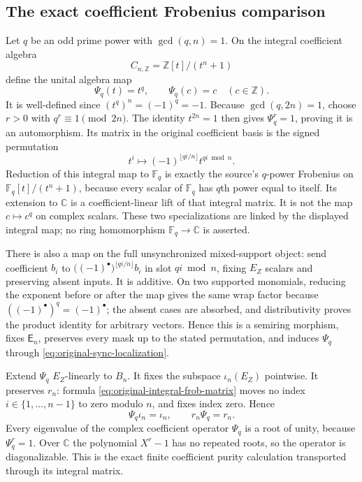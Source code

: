\subsection{The exact coefficient Frobenius comparison}

Let $q$ be an odd prime power with $\gcd(q,n)=1$.
On the integral coefficient algebra
\[
 C_{n,\mathbb Z}=\mathbb Z[t]/(t^n+1)
\]
define the unital algebra map
\[
 \Psi_q(t)=t^q,\qquad \Psi_q(c)=c\quad(c\in\mathbb Z).
\]
It is well-defined since $(t^q)^n=(-1)^q=-1$.
Because $\gcd(q,2n)=1$, choose $r>0$ with $q^r\equiv1\pmod{2n}$.
The identity $t^{2n}=1$ then gives $\Psi_q^r=1$, proving it is an
automorphism. Its matrix in the original coefficient basis is the
signed permutation
\begin{equation}
 t^i\longmapsto(-1)^{\lfloor qi/n\rfloor}t^{qi\bmod n}.
 \label{eq:original-integral-frob-matrix}
\end{equation}
Reduction of this integral map to $\mathbb F_q$ is exactly the
source's $q$-power Frobenius on $\mathbb F_q[t]/(t^n+1)$, because
every scalar of $\mathbb F_q$ has $q$th power equal to itself.
Its extension to $\mathbb C$ is a coefficient-linear lift of that
integral matrix. It is not the map $c\mapsto c^q$ on complex scalars.
These two specializations are linked by the displayed integral map;
no ring homomorphism $\mathbb F_q\to\mathbb C$ is asserted.

There is also a map on the full unsynchronized mixed-support object:
send coefficient $b_i$ to
$\bigl((-1)^\bullet\bigr)^{\lfloor qi/n\rfloor}b_i$ in slot $qi\bmod n$,
fixing $E_Z$ scalars and preserving absent inputs. It is additive.
On two supported monomials, reducing the exponent before or after
the map gives the same wrap factor because $((-1)^\bullet)^q=(-1)^\bullet$;
the absent cases are absorbed, and distributivity proves the product
identity for arbitrary vectors. Hence this is a semiring morphism,
fixes $\mathsf E_n$, preserves every mask up to the stated permutation,
and induces $\Psi_q$ through \eqref{eq:original-sync-localization}.

Extend $\Psi_q$ $E_Z$-linearly to $B_n$. It fixes the subspace
$\iota_n(E_Z)$ pointwise. It preserves $r_n$: formula
\eqref{eq:original-integral-frob-matrix} moves no index
$i\in\{1,\ldots,n-1\}$ to zero modulo $n$, and fixes index zero.
Hence
\begin{equation}
 \Psi_q\iota_n=\iota_n,\qquad r_n\Psi_q=r_n.
 \label{eq:original-frob-retract}
\end{equation}
Every eigenvalue of the complex coefficient operator $\Psi_q$ is
a root of unity, because $\Psi_q^r=1$. Over $\mathbb C$ the
polynomial $X^r-1$ has no repeated roots, so the operator is
diagonalizable. This is the exact finite coefficient purity
calculation transported through its integral matrix.

